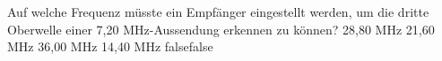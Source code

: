     {Auf welche Frequenz müsste ein Empfänger eingestellt werden, um die dritte Oberwelle einer 7,20 MHz-Aussendung erkennen zu können?}
    {28,80 MHz}
    {21,60 MHz}
    {36,00 MHz}
    {14,40 MHz}
    {false}{false}